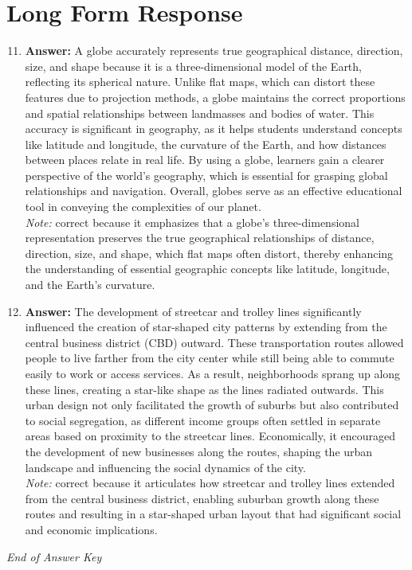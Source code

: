\documentclass[12pt]{article}
\begin{document}
\section*{Long Form Response}
\begin{enumerate}[label=\arabic*.]
\setcounter{enumi}{10}
\item \textbf{Answer:} A globe accurately represents true geographical distance, direction, size, and shape because it is a three-dimensional model of the Earth, reflecting its spherical nature. Unlike flat maps, which can distort these features due to projection methods, a globe maintains the correct proportions and spatial relationships between landmasses and bodies of water. This accuracy is significant in geography, as it helps students understand concepts like latitude and longitude, the curvature of the Earth, and how distances between places relate in real life. By using a globe, learners gain a clearer perspective of the world's geography, which is essential for grasping global relationships and navigation. Overall, globes serve as an effective educational tool in conveying the complexities of our planet.
\\ \textit{Note:} correct because it emphasizes that a globe's three-dimensional representation preserves the true geographical relationships of distance, direction, size, and shape, which flat maps often distort, thereby enhancing the understanding of essential geographic concepts like latitude, longitude, and the Earth's curvature.
\item \textbf{Answer:} The development of streetcar and trolley lines significantly influenced the creation of star-shaped city patterns by extending from the central business district (CBD) outward. These transportation routes allowed people to live farther from the city center while still being able to commute easily to work or access services. As a result, neighborhoods sprang up along these lines, creating a star-like shape as the lines radiated outwards. This urban design not only facilitated the growth of suburbs but also contributed to social segregation, as different income groups often settled in separate areas based on proximity to the streetcar lines. Economically, it encouraged the development of new businesses along the routes, shaping the urban landscape and influencing the social dynamics of the city.
\\ \textit{Note:} correct because it articulates how streetcar and trolley lines extended from the central business district, enabling suburban growth along these routes and resulting in a star-shaped urban layout that had significant social and economic implications.
\end{enumerate}

\vfill
\noindent\textit{End of Answer Key}
\end{document}
